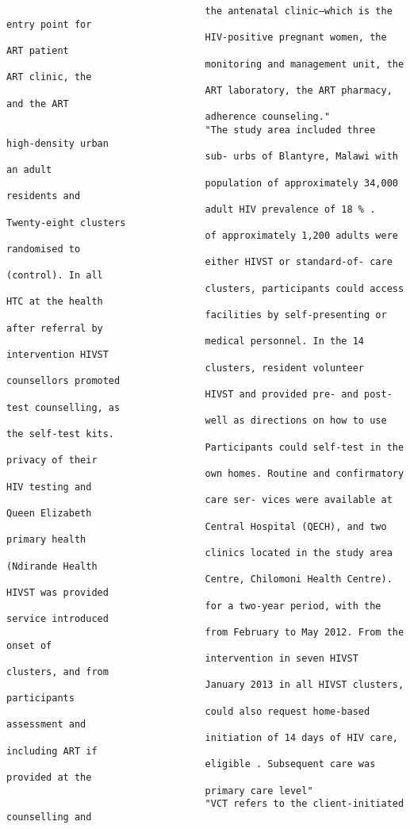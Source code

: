 \documentclass{article}
\begin{document}
\begin{verbatim}
                                   the antenatal clinic—which is the entry point for
                                   HIV-positive pregnant women, the ART patient
                                   monitoring and management unit, the ART clinic, the
                                   ART laboratory, the ART pharmacy, and the ART
                                   adherence counseling."
                                   "The study area included three high-density urban
                                   sub- urbs of Blantyre, Malawi with an adult
                                   population of approximately 34,000 residents and
                                   adult HIV prevalence of 18 % . Twenty-eight clusters
                                   of approximately 1,200 adults were randomised to
                                   either HIVST or standard-of- care (control). In all
                                   clusters, participants could access HTC at the health
                                   facilities by self-presenting or after referral by
                                   medical personnel. In the 14 intervention HIVST
                                   clusters, resident volunteer counsellors promoted
                                   HIVST and provided pre- and post-test counselling, as
                                   well as directions on how to use the self-test kits.
                                   Participants could self-test in the privacy of their
                                   own homes. Routine and confirmatory HIV testing and
                                   care ser- vices were available at Queen Elizabeth
                                   Central Hospital (QECH), and two primary health
                                   clinics located in the study area (Ndirande Health
                                   Centre, Chilomoni Health Centre). HIVST was provided
                                   for a two-year period, with the service introduced
                                   from February to May 2012. From the onset of
                                   intervention in seven HIVST clusters, and from
                                   January 2013 in all HIVST clusters, participants
                                   could also request home-based assessment and
                                   initiation of 14 days of HIV care, including ART if
                                   eligible . Subsequent care was provided at the
                                   primary care level"
                                   "VCT refers to the client-initiated counselling and

\end{verbatim}
\end{document}
